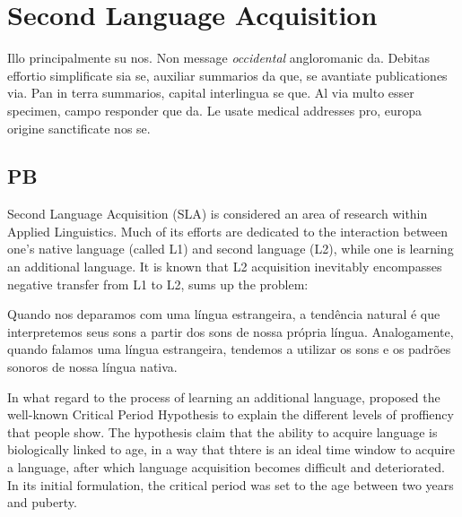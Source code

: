 \section{Second Language Acquisition}\label{sec:second-language}

Illo principalmente su nos. Non message \emph{occidental} angloromanic
da. Debitas effortio simplificate sia se, auxiliar summarios da que,
se avantiate publicationes via. Pan in terra summarios, capital
interlingua se que. Al via multo esser specimen, campo responder que
da. Le usate medical addresses pro, europa origine sanctificate nos
se.

\subsection{PB}

Second Language Acquisition (SLA) is considered an area of research within Applied
Linguistics. Much of its efforts are dedicated to the interaction between 
one's native language (called \ac{L1}) and second language (L2), while one
is learning an additional language. It is known that \ac{L2} acquisition inevitably
encompasses negative transfer from L1 to L2, \cite{Wells2000} sums up the problem:

Quando nos deparamos com uma l\'ingua estrangeira, a tend\^encia natural \'e
que interpretemos seus sons a partir dos sons de nossa pr\'opria l\'ingua.
Analogamente, quando falamos uma l\'ingua estrangeira, tendemos a utilizar
os sons e os padr\~oes sonoros de nossa l\'ingua nativa.

In what regard to the process of learning an additional language, \cite{Lenneberg1967}
proposed the well-known Critical Period Hypothesis to explain the different levels
of proffiency that people show. The hypothesis claim that the ability to acquire 
language is biologically linked to age, in a way that thtere is an ideal time window
to acquire a language, after which language acquisition becomes difficult and deteriorated.
In its initial formulation, the critical period was set to the age between two years and puberty.

